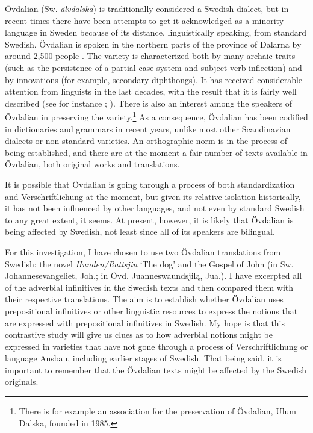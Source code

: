 \documentclass[output=paper]{langscibook}
\begin{document}
Övdalian (Sw. \textit{älvdalska}) is traditionally considered a Swedish dialect, but in recent times there have been attempts to get it acknowledged as a minority language in Sweden because of its distance, linguistically speaking, from standard Swedish. Övdalian is spoken in the northern parts of the province of Dalarna by around 2,500 people \citep[27]{Garbacz2009}. The variety is characterized both by many archaic traits (such as the persistence of a partial case system and subject-verb inflection) and by innovations (for example, secondary diphthongs). It has received considerable attention from linguists in the last decades, with the result that it is fairly well described (see for instance \citealt{Garbacz2009}; \citealt{BentzenEtAl2015}). There is also an interest among the speakers of Övdalian in preserving the variety.\footnote{There is for example an association for the preservation of Övdalian, Ulum Dalska, founded in 1985.} As a consequence, Övdalian has been codified in dictionaries and grammars in recent years, unlike most other Scandinavian dialects or non-standard varieties. An orthographic norm is in the process of being established, and there are at the moment a fair number of texts available in Övdalian, both original works and translations. 

It is possible that Övdalian is going through a process of both standardization and Verschriftlichung at the moment, but given its relative isolation historically, it has not been influenced by other languages, and not even by standard Swedish to any great extent, it seems. At present, however, it is likely that Övdalian is being affected by Swedish, not least since all of its speakers are bilingual. 

For this investigation, I have chosen to use two Övdalian translations from Swedish: the novel \textit{Hunden/Rattsjin} ‘The dog’ and the Gospel of John (in Sw. Johannesevangeliet, Joh.; in Övd. Juanneswaundsjilą, Jua.). I have excerpted all of the adverbial infinitives in the Swedish texts and then compared them with their respective translations. The aim is to establish whether Övdalian uses prepositional infinitives or other linguistic resources to express the notions that are expressed with prepositional infinitives in Swedish. My hope is that this contrastive study will give us clues as to how adverbial notions might be expressed in varieties that have not gone through a process of Verschriftlichung or language Ausbau, including earlier stages of Swedish. That being said, it is important to remember that the Övdalian texts might be affected by the Swedish originals. 
\end{document}
